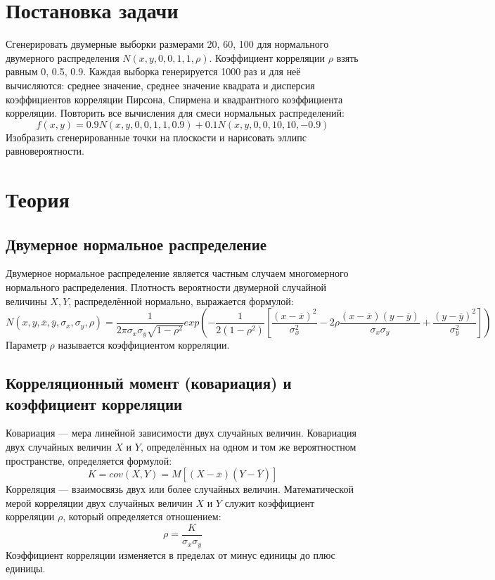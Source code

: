 \newpage
\listoffigures

\newpage
\listoftables

\newpage
\section{Постановка задачи}
Сгенерировать двумерные выборки размерами 20, 60, 100 для нормального двумерного распределения $N(x, y, 0, 0, 1, 1, \rho)$. Коэффициент корреляции $\rho$ взять равным 0, 0.5, 0.9.
Каждая выборка генерируется 1000 раз и для неё вычисляются: среднее значение, среднее значение квадрата и дисперсия коэффициентов корреляции Пирсона, Спирмена и квадрантного коэффициента корреляции.
Повторить все вычисления для смеси нормальных распределений:
\begin{equation} \label{eq:f(x, y)}
f(x, y) = 0.9N(x, y, 0, 0, 1, 1, 0.9) + 0.1N(x, y, 0, 0, 10, 10, -0.9)
\end{equation}
Изобразить сгенерированные точки на плоскости и нарисовать эллипс
равновероятности.

\section{Теория}
\subsection{Двумерное нормальное распределение}
Двумерное нормальное распределение является частным случаем многомерного нормального распределения. Плотность вероятности двумерной случайной величины $X, Y$, распределённой нормально, выражается формулой:
\begin{equation} \label{eq:N(x, y...)} 
N(x, y, \overline{x}, \overline{y}, \sigma_x, \sigma_y, \rho) = 
\frac{1}{2 \pi \sigma_x \sigma_y \sqrt{1-\rho^2}} 
exp (-\frac{1}{2(1-\rho^2)} [\frac{(x-\overline{x})^2}{\sigma_x^2}
- 2\rho\frac{(x-\overline{x})(y-\overline{y})}{\sigma_x \sigma_y} + \frac{(y-\overline{y})^2}{\sigma_y^2}])
\end{equation}
Параметр $\rho$ называется коэффициентом корреляции.

\subsection{Корреляционный момент (ковариация) и коэффициент корреляции}
Ковариация — мера линейной зависимости двух случайных величин. Ковариация двух случайных величин $X$ и $Y$, определённых на одном и том же вероятностном пространстве, определяется формулой:
\begin{equation} \label{eq:K}
K = cov(X, Y) = M[(X-\overline{x})(Y-\overline{Y})] 
\end{equation}
Корреляция — взаимосвязь двух или более случайных величин. Математической мерой корреляции двух случайных величин $X$ и $Y$ служит коэффициент корреляции $\rho$, который определяется отношением:
\begin{equation} \label{eq:K}
\rho = \frac{K}{\sigma_x \sigma_y}
\end{equation}
Коэффициент корреляции изменяется в пределах от минус единицы до плюс единицы.

